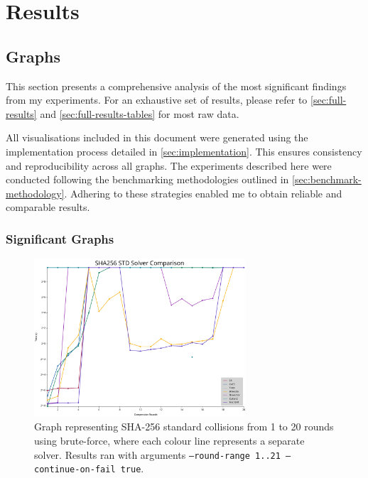 \documentclass[a4paper]{report}
\begin{document}
\chapter{Results}
\section{Graphs}
\label{sec:graphs}
This section presents a comprehensive analysis of the most significant findings from my experiments.
For an exhaustive set of results, please refer to \ref{sec:full-results} and \ref{sec:full-results-tables} for most raw data.

All visualisations included in this document were generated using the implementation process detailed in \ref{sec:implementation}.
This ensures consistency and reproducibility across all graphs.
The experiments described here were conducted following the benchmarking methodologies outlined in \ref{sec:benchmark-methodology}.
Adhering to these strategies enabled me to obtain reliable and comparable results.

\subsection{Significant Graphs}
\begin{figure}[H]
	\centering
	\includegraphics[width=0.7\textwidth]{../../graphs/solver_comparison_SHA256_STD.svg}
	\caption{Graph representing SHA-256 standard collisions from 1 to 20 rounds using brute-force, where each colour line represents a separate solver.
	Results ran with arguments \texttt{--round-range 1..21 --continue-on-fail true}.}
	\label{fig:sha256_std}
\end{figure}
\end{document}
